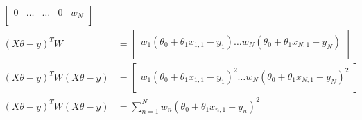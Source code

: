 \documentclass[11pt]{article}
\begin{document}
\begin{enumerate}
{{\begin{align}
\begin{bmatrix}
0 & \hdots & \hdots &0 &  w_N\\
\end{bmatrix} \\
(X\theta - y)^TW &=
\begin{bmatrix}
w_1(\theta_0 + \theta_1x_{1,1}-y_1) \hdots w_N(\theta_0 + \theta_1x_{N,1}-y_N) \\
\end{bmatrix} \\
(X\theta - y)^TW(X\theta - y) &=
\begin{bmatrix}
w_1(\theta_0 + \theta_1x_{1,1}-y_1)^2 \hdots w_N(\theta_0 + \theta_1x_{N,1}-y_N)^2 \\
\end{bmatrix} \\
(X\theta - y)^TW(X\theta - y) &=  \sum_{n=1}^{N} w_n(\theta_0 + \theta_1 x_{n,1}-y_n)^2
\end{align}
}
}
\end{enumerate}
\newpage
\end{document}

